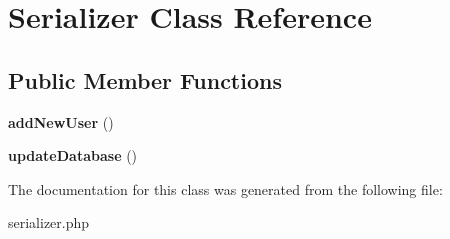 \hypertarget{classSerializer}{\section{Serializer Class Reference}
\label{classSerializer}
}
\subsection*{Public Member Functions}
\begin{DoxyCompactItemize}
\item 
\hypertarget{classSerializer_a5a7d00e725e539b5d3cd0ca47318ccf9}{{\bfseries add\-New\-User} ()}\label{classSerializer_a5a7d00e725e539b5d3cd0ca47318ccf9}

\item 
\hypertarget{classSerializer_ad9909fac78685e3a4f6a59c587c60629}{{\bfseries update\-Database} ()}\label{classSerializer_ad9909fac78685e3a4f6a59c587c60629}

\end{DoxyCompactItemize}


The documentation for this class was generated from the following file\-:\begin{DoxyCompactItemize}
\item 
serializer.\-php\end{DoxyCompactItemize}
